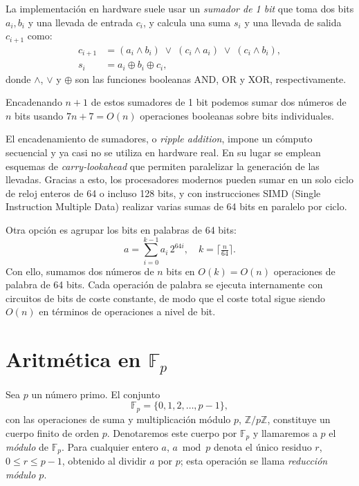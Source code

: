 La implementación en hardware suele usar un \emph{sumador de 1 bit} que toma dos bits \(a_i,b_i\) y una llevada de entrada \(c_i\), y calcula una suma \(s_i\) y una llevada de salida \(c_{i+1}\) como:
\[
\begin{aligned}
c_{i+1} &= (a_i\land b_i)\;\lor\;(c_i\land a_i)\;\lor\;(c_i\land b_i),\\
s_i     &= a_i\oplus b_i\oplus c_i,
\end{aligned}
\]
donde \(\land\), \(\lor\) y \(\oplus\) son las funciones booleanas AND, OR y XOR, respectivamente.  

Encadenando \(n+1\) de estos sumadores de 1 bit podemos sumar dos números de \(n\) bits usando \(7n+7 = O(n)\) operaciones booleanas sobre bits individuales.  

\begin{remark}
El encadenamiento de sumadores, o \emph{ripple addition}, impone un cómputo secuencial y ya casi no se utiliza en hardware real. En su lugar se emplean esquemas de \emph{carry-lookahead} que permiten paralelizar la generación de las llevadas. Gracias a esto, los procesadores modernos pueden sumar en un solo ciclo de reloj enteros de 64 o incluso 128 bits, y con instrucciones SIMD (Single Instruction Multiple Data) realizar varias sumas de 64 bits en paralelo por ciclo.  

Otra opción es agrupar los bits en palabras de 64 bits:  
\[
  a = \sum_{i=0}^{k-1} a_i\,2^{64i},
  \quad k = \bigl\lceil \tfrac{n}{64}\bigr\rceil.
\]
Con ello, sumamos dos números de \(n\) bits en \(O(k)=O(n)\) operaciones de palabra de 64 bits. Cada operación de palabra se ejecuta internamente con circuitos de bits de coste constante, de modo que el coste total sigue siendo \(O(n)\) en términos de operaciones a nivel de bit.
\end{remark}


\section{Aritmética en \texorpdfstring{$\mathbb{F}_p$}{Fp}}
\label{sec:aritmetica-fp}
Sea $p$ un número primo. El conjunto
$$
  \mathbb{F}_p = \{0,1,2,\dots,p-1\},
$$
con las operaciones de suma y multiplicación módulo $p$, $\mathbb{Z}/p\mathbb{Z}$, constituye un cuerpo finito de orden $p$. Denotaremos este cuerpo por $\mathbb{F}_p$ y llamaremos a $p$ el \emph{módulo} de $\mathbb{F}_p$. Para cualquier entero $a$, $a \bmod p$ denota el único residuo $r$, $0\le r\le p-1$, obtenido al dividir $a$ por $p$; esta operación se llama \emph{reducción módulo $p$}.

